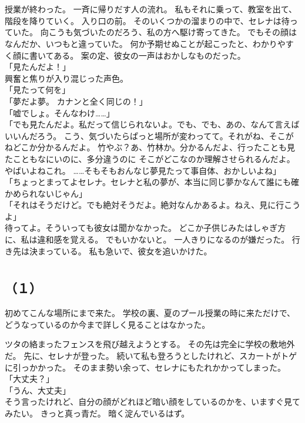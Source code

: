 \documentclass[../IHMain]{subfiles}
\begin{document}
\section{}
授業が終わった。
一斉に帰りだす人の流れ。
私もそれに乗って、教室を出て、階段を降りていく。
入り口の前。
そのいくつかの溜まりの中で、セレナは待っていた。
向こうも気づいたのだろう、私の方へ駆け寄ってきた。
でもその顔はなんだか、いつもと違っていた。
何か予期せぬことが起こったと、わかりやすく顔に書いてある。
案の定、彼女の一声はおかしなものだった。\\
「見たんだよ！」\\
興奮と焦りが入り混じった声色。\\
「見たって何を」\\
「夢だよ夢。
カナンと全く同じの！」\\
「嘘でしょ。そんなわけ……」\\
「でも見たんだよ。私だって信じられないよ。でも、でも、あの、なんて言えばいいんだろう。
こう、気づいたらぱっと場所が変わってて。それがね、そこがねどこか分かるんだよ。
竹やぶ？あ、竹林か。分かるんだよ、行ったことも見たこともなにいのに、多分違うのに
そこがどこなのか理解させられるんだよ。やばいよねこれ。
……そもそもおんなじ夢見たって事自体、おかしいよね」\\
「ちょっとまってよセレナ。セレナと私の夢が、本当に同じ夢かなんて誰にも確かめられないじゃん」\\
「それはそうだけど。でも絶対そうだよ。絶対なんかあるよ。ねえ、見に行こうよ」\\
待ってよ。そういっても彼女は聞かなかった。
どこか子供じみたはしゃぎ方に、私は違和感を覚える。
でもいかないと。
一人きりになるのが嫌だった。
行き先は決まっている。
私も急いで、彼女を追いかけた。
\section{}
\subsection*{（１）}
初めてこんな場所にまで来た。
学校の裏、夏のプール授業の時に来ただけで、どうなっているのか今まで詳しく見ることはなかった。

ツタの絡まったフェンスを飛び越えようとする。
その先は完全に学校の敷地外だ。
先に、セレナが登った。
続いて私も登ろうとしたけれど、スカートがトゲに引っかかった。
そのまま勢い余って、セレナにもたれかかってしまった。
「大丈夫？」\\
「うん、大丈夫」\\
そう言ったけれど、自分の顔がどれほど暗い顔をしているのかを、いますぐ見てみたい。
きっと真っ青だ。
暗く淀んでいるはず。
\end{document}
